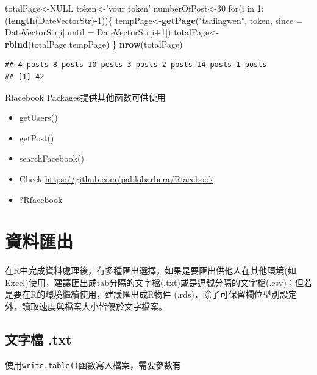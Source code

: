 \documentclass[]{book}
\newenvironment{Shaded}{\begin{snugshade}}{\end{snugshade}}
\newcommand{\KeywordTok}[1]{\textcolor[rgb]{0.13,0.29,0.53}{\textbf{{#1}}}}
\newcommand{\DataTypeTok}[1]{\textcolor[rgb]{0.13,0.29,0.53}{{#1}}}
\newcommand{\DecValTok}[1]{\textcolor[rgb]{0.00,0.00,0.81}{{#1}}}
\newcommand{\StringTok}[1]{\textcolor[rgb]{0.31,0.60,0.02}{{#1}}}
\newcommand{\OtherTok}[1]{\textcolor[rgb]{0.56,0.35,0.01}{{#1}}}
\newcommand{\NormalTok}[1]{{#1}}
\providecommand{\tightlist}{%
  \setlength{\itemsep}{0pt}\setlength{\parskip}{0pt}}
\theoremstyle{definition}
\theoremstyle{definition}
\theoremstyle{remark}
\begin{document}
\begin{Shaded}
\begin{Highlighting}[]
\NormalTok{totalPage<-}\OtherTok{NULL}
\NormalTok{token<-}\StringTok{'your token'}
\NormalTok{numberOfPost<-}\DecValTok{30}
\NormalTok{for(i in }\DecValTok{1}\NormalTok{:(}\KeywordTok{length}\NormalTok{(DateVectorStr)-}\DecValTok{1}\NormalTok{))\{}
    \NormalTok{tempPage<-}\KeywordTok{getPage}\NormalTok{(}\StringTok{"tsaiingwen"}\NormalTok{, token,}
                      \DataTypeTok{since =} \NormalTok{DateVectorStr[i],}\DataTypeTok{until =} \NormalTok{DateVectorStr[i}\DecValTok{+1}\NormalTok{])}
    \NormalTok{totalPage<-}\KeywordTok{rbind}\NormalTok{(totalPage,tempPage)}
\NormalTok{\}}
\KeywordTok{nrow}\NormalTok{(totalPage)}
\end{Highlighting}
\end{Shaded}

\begin{verbatim}
## 4 posts 8 posts 10 posts 3 posts 2 posts 14 posts 1 posts
## [1] 42
\end{verbatim}

Rfacebook Packages提供其他函數可供使用

\begin{itemize}
\tightlist
\item
  getUsers()
\item
  getPost()
\item
  searchFacebook()
\item
  Check \url{https://github.com/pablobarbera/Rfacebook}
\item
  ?Rfacebook
\end{itemize}

\section{資料匯出}

在R中完成資料處理後，有多種匯出選擇，如果是要匯出供他人在其他環境(如Excel)使用，建議匯出成tab分隔的文字檔(.txt)或是逗號分隔的文字檔(.csv)；但若是要在R的環境繼續使用，建議匯出成R物件
(.rds)，除了可保留欄位型別設定外，讀取速度與檔案大小皆優於文字檔案。

\subsection{文字檔 .txt}\label{-.txt}

使用\texttt{write.table()}函數寫入檔案，需要參數有
\end{document}
